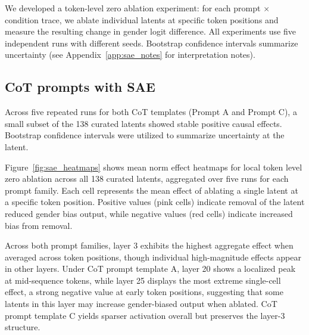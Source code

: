\documentclass{article}
\begin{document}

We developed a token-level zero ablation experiment: for each prompt $\times$ condition trace, we ablate individual latents at specific token positions and measure the resulting change in gender logit difference. All experiments use five independent runs with different seeds. Bootstrap confidence intervals summarize uncertainty (see Appendix~\ref{app:sae_notes} for interpretation notes).



\subsection{CoT prompts with SAE}
Across five repeated runs for both CoT templates (Prompt A and Prompt C), a small subset of the 138 curated latents showed stable positive causal effects. Bootstrap confidence intervals were utilized to summarize uncertainty at the latent.

Figure~\ref{fig:sae_heatmaps} shows mean norm effect heatmaps for local token level zero ablation across all 138 curated latents, aggregated over five runs for each prompt family. Each cell represents the mean effect of ablating a single latent at a specific token position. Positive values (pink cells) indicate removal of the latent reduced gender bias output, while negative values (red cells) indicate increased bias from removal.

Across both prompt families, layer 3 exhibits the highest aggregate effect when averaged across token positions, though individual high-magnitude effects appear in other layers. Under CoT prompt template A, layer 20 shows a localized peak at mid-sequence tokens, while layer 25 displays the most extreme single-cell effect, a strong negative value at early token positions, suggesting that some latents in this layer may increase gender-biased output when ablated. CoT prompt template C yields sparser activation overall but preserves the layer-3 structure.
\end{document}
